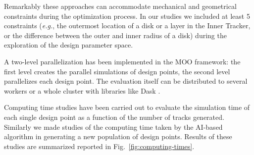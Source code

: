 Remarkably these approaches can accommodate mechanical and geometrical constraints during the optimization process. In our studies we included at least 5 constraints (\textit{e.g.}, the outermost location of a disk or a layer in the Inner Tracker, or the difference between the outer and inner radius of a disk) during the exploration of the design parameter space.  

A two-level parallelization has been implemented in the MOO framework: the first level creates the parallel simulations of design points, the second level parallelizes each design point. 
The evaluation itself can be distributed to several workers or a whole cluster with libraries like Dask \cite{dask}.

Computing time studies have been carried out to evaluate the simulation time of each single design point as a function of the number of tracks generated. 
Similarly we made studies of the computing time taken by the AI-based algorithm in generating a new population of design points. 
Results of these studies are summarized reported in Fig.~\ref{fig:computing-times}.  


